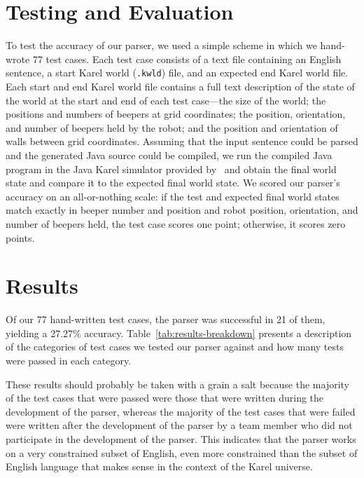 \documentclass[11pt]{article}
\begin{document}
\section{Testing and Evaluation}
To test the accuracy of our parser, we used a simple scheme in which we hand-wrote 77 test cases.
Each test case consists of a text file containing an English sentence, a start Karel world
(\texttt{.kwld}) file, and an expected end Karel world file. Each start and end Karel world file
contains a full text description of the state of the world at the start and end of each test
case---the size of the world; the positions and numbers of beepers at grid coordinates; the
position, orientation, and number of beepers held by the robot; and the position and orientation of
walls between grid coordinates. Assuming that the input sentence could be parsed and the generated
Java source could be compiled, we run the compiled Java program in the Java Karel simulator
provided by~ and obtain the final world state and compare it to the expected
final world state. We scored our parser's accuracy on an all-or-nothing scale: if the test and
expected final world states match exactly in beeper number and position and robot position,
orientation, and number of beepers held, the test case scores one point; otherwise, it scores zero
points.

\section{Results}
Of our 77 hand-written test cases, the parser was successful in 21 of them, yielding a 27.27\%
accuracy. Table~\ref{tab:results-breakdown} presents a description of the categories of test cases
we tested our parser against and how many tests were passed in each category.

These results should probably be taken with a grain a salt because the majority of the
test cases that were passed were those that were written during the development of the parser,
whereas the majority of the test cases that were failed were written after the development of the
parser by a team member who did not participate in the development of the parser. This indicates
that the parser works on a very constrained subset of English, even more constrained than the
subset of English language that makes sense in the context of the Karel universe.
\end{document}
